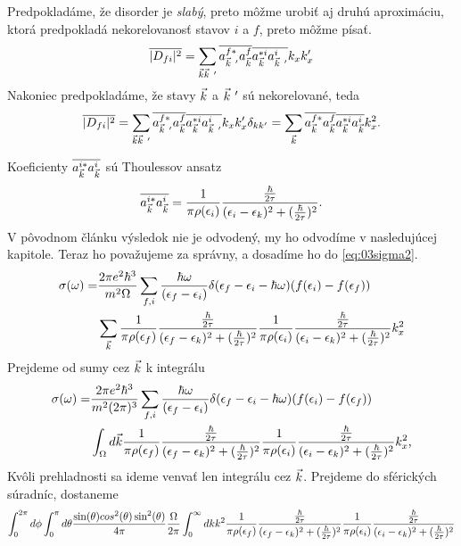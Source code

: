 Predpokladáme, že disorder je {\it slabý}, preto môžme urobiť aj druhú aproximáciu, ktorá predpokladá nekorelovanosť stavov $i$ a $f$, preto môžme písať.
\begin{align}
\overline{|D_{fi}|^2}=\sum_{\vk\vk\ '}\overline{a^{f*}_{\vk\ '}a^f_{\vk}}\overline{a^{*i}_{\vk}a^i_{\vk\ '}}k_xk_x' 
\end{align}
Nakoniec predpokladáme, že stavy $\vec{k}$ a $\vk\ '$ sú nekorelované, teda
\begin{align}
\label{eq:03dfisq3}
\overline{|D_{fi}|^2}=\sum_{\vk\vk\ '}\overline{a^{f*}_{\vk\ '}a^f_{\vk}}\overline{a^{*i}_{\vk}a^i_{\vk\ '}}k_xk_x'\delta_{kk'}=\sum_{\vk}\overline{a^{f*}_{\vk}a^f_{\vk}}\overline{a^{*i}_{\vk}a^i_{\vk}}k_x^2\text{.}
\end{align}


Koeficienty  $\overline{a_{\vec{k}}^{i*}a_{\vec{k}}^i}$  sú Thoulessov ansatz
\begin{align}
\label{eq:03lorenz}
\overline{a_{\vec{k}}^{i*}a_{\vec{k}}^i}=\frac{1}{\pi\rho(\epsilon_i)}\frac{\frac{\hbar}{2\tau}}{(\epsilon_i-\epsilon_{k})^2+(\frac{\hbar}{2\tau})^2}\text{.}
\end{align}
V pôvodnom článku výsledok nie je odvodený, my ho odvodíme v nasledujúcej kapitole. Teraz ho považujeme za správny, a dosadíme ho do \eqref{eq:03sigma2}.
\begin{align}
\sigma(\omega)=&\frac{2\pi e^2\hbar^3}{m^2\Omega}\sum_{f,i}\frac{\hbar\omega}{(\epsilon_f-\epsilon_i)}\delta(\epsilon_f-\epsilon_i-\hbar\omega)(f(\epsilon_i)-f(\epsilon_f))\\ \notag
&\sum_{\vec{k}}\frac{1}{\pi\rho(\epsilon_f)}\frac{\frac{\hbar}{2\tau}}{(\epsilon_f-\epsilon_{k})^2+(\frac{\hbar}{2\tau})^2}\frac{1}{\pi\rho(\epsilon_i)}\frac{\frac{\hbar}{2\tau}}{(\epsilon_i-\epsilon_{k})^2+(\frac{\hbar}{2\tau})^2}k_x^2
\end{align}
Prejdeme od sumy cez $\vec{k}$ k integrálu
\begin{align}
\label{eq:03sigma3}
\sigma(\omega)=&\frac{2\pi e^2\hbar^3}{m^2(2\pi)^3}\sum_{f,i}\frac{\hbar\omega}{(\epsilon_f-\epsilon_i)}\delta(\epsilon_f-\epsilon_i-\hbar\omega)(f(\epsilon_i)-f(\epsilon_f))\\ \notag
&\int_{\Omega}d\vec{k}\frac{1}{\pi\rho(\epsilon_f)}\frac{\frac{\hbar}{2\tau}}{(\epsilon_f-\epsilon_{k})^2+(\frac{\hbar}{2\tau})^2}\frac{1}{\pi\rho(\epsilon_i)}\frac{\frac{\hbar}{2\tau}}{(\epsilon_i-\epsilon_{k})^2+(\frac{\hbar}{2\tau})^2}k_x^2\text{,}
\end{align}
 Kvôli prehladnosti sa ideme venvať len integrálu cez $\vec{k}$. Prejdeme do sférických súradníc, dostaneme
\begin{align}
\int_0^{2\pi}d\phi\int_0^\pi d\theta \frac{\sin(\theta)cos^2(\theta)\sin^2(\theta)}{4\pi} \frac{\Omega}{2\pi} \int_0^\infty dk k^2 \frac{1}{\pi\rho(\epsilon_f)}\frac{\frac{\hbar}{2\tau}}{(\epsilon_f-\epsilon_{k})^2+(\frac{\hbar}{2\tau})^2} \frac{1}{\pi\rho(\epsilon_i)}\frac{\frac{\hbar}{2\tau}}{(\epsilon_i-\epsilon_{k})^2+(\frac{\hbar}{2\tau})^2} 
\end{align}

